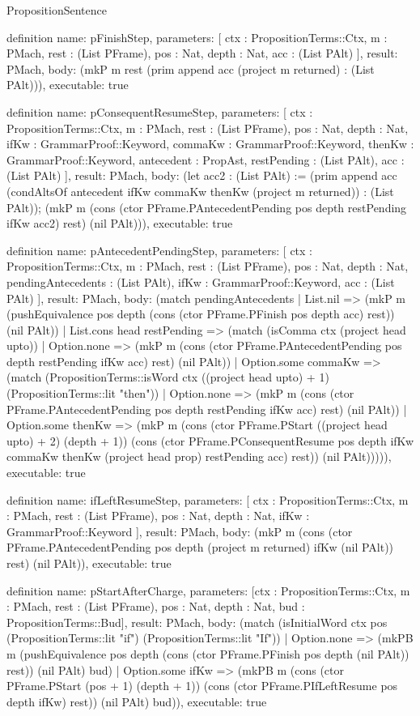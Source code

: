 \begin{lexlean}{PropositionSentence}
\begin{semanticmodule}
definition{
  name: pFinishStep,
  parameters: [
    ctx : PropositionTerms::Ctx,
    m : PMach,
    rest : (List PFrame),
    pos : Nat,
    depth : Nat,
    acc : (List PAlt)
  ],
  result: PMach,
  body: (mkP m rest (prim append acc (project m returned) : (List PAlt))),
  executable: true
}

definition{
  name: pConsequentResumeStep,
  parameters: [
    ctx : PropositionTerms::Ctx,
    m : PMach,
    rest : (List PFrame),
    pos : Nat,
    depth : Nat,
    ifKw : GrammarProof::Keyword,
    commaKw : GrammarProof::Keyword,
    thenKw : GrammarProof::Keyword,
    antecedent : PropAst,
    restPending : (List PAlt),
    acc : (List PAlt)
  ],
  result: PMach,
  body: (let acc2 : (List PAlt) := (prim append acc (condAltsOf antecedent ifKw commaKw thenKw (project m returned)) : (List PAlt)); (mkP m (cons (ctor PFrame.PAntecedentPending pos depth restPending ifKw acc2) rest) (nil PAlt))),
  executable: true
}

definition{
  name: pAntecedentPendingStep,
  parameters: [
    ctx : PropositionTerms::Ctx,
    m : PMach,
    rest : (List PFrame),
    pos : Nat,
    depth : Nat,
    pendingAntecedents : (List PAlt),
    ifKw : GrammarProof::Keyword,
    acc : (List PAlt)
  ],
  result: PMach,
  body: (match pendingAntecedents
    | List.nil => (mkP m (pushEquivalence pos depth (cons (ctor PFrame.PFinish pos depth acc) rest)) (nil PAlt))
    | List.cons head restPending => (match (isComma ctx (project head upto))
        | Option.none => (mkP m (cons (ctor PFrame.PAntecedentPending pos depth restPending ifKw acc) rest) (nil PAlt))
        | Option.some commaKw => (match (PropositionTerms::isWord ctx ((project head upto) + 1) (PropositionTerms::lit "then"))
            | Option.none => (mkP m (cons (ctor PFrame.PAntecedentPending pos depth restPending ifKw acc) rest) (nil PAlt))
            | Option.some thenKw => (mkP m (cons (ctor PFrame.PStart ((project head upto) + 2) (depth + 1)) (cons (ctor PFrame.PConsequentResume pos depth ifKw commaKw thenKw (project head prop) restPending acc) rest)) (nil PAlt))))),
  executable: true
}

definition{
  name: ifLeftResumeStep,
  parameters: [
    ctx : PropositionTerms::Ctx,
    m : PMach,
    rest : (List PFrame),
    pos : Nat,
    depth : Nat,
    ifKw : GrammarProof::Keyword
  ],
  result: PMach,
  body: (mkP m (cons (ctor PFrame.PAntecedentPending pos depth (project m returned) ifKw (nil PAlt)) rest) (nil PAlt)),
  executable: true
}

definition{
  name: pStartAfterCharge,
  parameters: [ctx : PropositionTerms::Ctx, m : PMach, rest : (List PFrame), pos : Nat, depth : Nat, bud : PropositionTerms::Bud],
  result: PMach,
  body: (match (isInitialWord ctx pos (PropositionTerms::lit "if") (PropositionTerms::lit "If"))
    | Option.none => (mkPB m (pushEquivalence pos depth (cons (ctor PFrame.PFinish pos depth (nil PAlt)) rest)) (nil PAlt) bud)
    | Option.some ifKw => (mkPB m (cons (ctor PFrame.PStart (pos + 1) (depth + 1)) (cons (ctor PFrame.PIfLeftResume pos depth ifKw) rest)) (nil PAlt) bud)),
  executable: true
}


\end{semanticmodule}
\end{lexlean}
